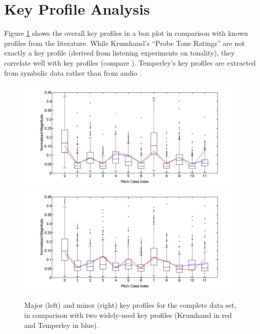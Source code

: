 \documentclass{article}
\begin{document}
\section{Key Profile Analysis}\label{sec:keyprof}
Figure \ref{fig:OverallKeyProfiles} shows the overall key profiles in a box plot in comparison with known profiles from the literature. 
While Krum\-hansl's ``Probe Tone Ratings'' \cite{krumhansl_cognitive_1990} are not exactly a key profile (derived from listening experiments on tonality), they correlate well with key profiles (compare \cite{izmirli_template_2005}). 
Temperley's key profiles are extracted from symbolic data  rather than from audio \cite{temperley_bayesian_2004,temperley_pitch-class_2008}.
\begin{figure}[htb]
\centering
    \includegraphics[scale=.2]{graph/allMajChroma+Krum+Temp}
    \includegraphics[scale=.2]{graph/allMinChroma+Krum+Temp}
	\caption{Major (left) and minor (right) key profiles for the complete data set, in comparison with two widely-used key profiles (Krumhansl in red and Temperley in blue).}
	\label{fig:OverallKeyProfiles}
\end{figure}
\end{document}
